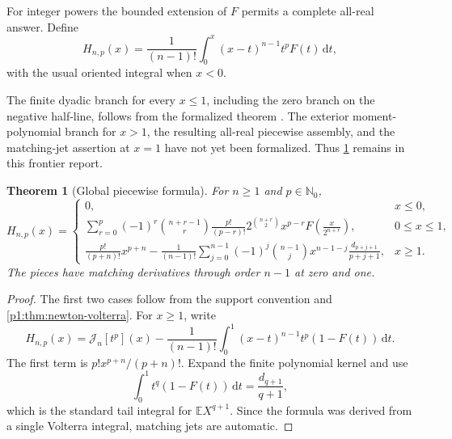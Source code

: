 \documentclass[11pt,oneside]{article}
\newtheorem{theorem}{Theorem}[section]
\theoremstyle{definition}
\theoremstyle{remark}
\newcommand{\E}{\mathbb E}
\newcommand{\N}{\mathbb N}
\newcommand{\dd}{\,\mathrm d}
\newcommand{\Jn}{\mathcal J}
\newcommand{\1}{\mathbf 1}
\begin{document}
For integer powers the bounded extension of \(F\) permits a complete all-real
answer.  Define
\begin{equation}
 H_{n,p}(x)=\frac1{(n-1)!}\int_0^x(x-t)^{n-1}t^pF(t)\dd t,       \label{p1:eq:Hnp-def}
\end{equation}
with the usual oriented integral when \(x<0\).

\begin{warningbox}
The finite dyadic branch for every \(x\leq1\), including the zero branch on
the negative half-line, follows from the formalized theorem
.  The exterior
moment-polynomial branch for \(x>1\), the resulting all-real piecewise
assembly, and the matching-jet assertion at \(x=1\) have not yet been
formalized.  Thus \cref{p1:thm:global-integer} remains in this frontier report.
\end{warningbox}

\begin{theorem}[Global piecewise formula]\label{p1:thm:global-integer}
For \(n\geq1\) and \(p\in\N_0\),
\begin{equation}
 H_{n,p}(x)=
 \begin{cases}
  0, & x\leq0,\\[1mm]
  \displaystyle
  \sum_{r=0}^{p}(-1)^r\binom{n+r-1}{r}\frac{p!}{(p-r)!}
  2^{\binom{n+r}{2}}x^{p-r}
  F\!\left(\frac{x}{2^{n+r}}\right),
   & 0\leq x\leq1,\\[4mm]
  \displaystyle
  \frac{p!}{(p+n)!}x^{p+n}
  -\frac1{(n-1)!}\sum_{j=0}^{n-1}(-1)^j\binom{n-1}{j}
  x^{n-1-j}\frac{d_{p+j+1}}{p+j+1},
   & x\geq1.
 \end{cases}                                                    \label{p1:eq:global-Hnp}
\end{equation}
The pieces have matching derivatives through order \(n-1\) at zero and one.
\end{theorem}

\begin{proof}
The first two cases follow from the support convention and
\cref{p1:thm:newton-volterra}.  For \(x\geq1\), write
\[
 H_{n,p}(x)=\Jn_n[t^p](x)
 -\frac1{(n-1)!}\int_0^1(x-t)^{n-1}t^p(1-F(t))\dd t.
\]
The first term is \(p!x^{p+n}/(p+n)!\).  Expand the finite polynomial kernel
and use
\begin{equation}
 \int_0^1t^q(1-F(t))\dd t=\frac{d_{q+1}}{q+1},                 \label{p1:eq:tail-moment}
\end{equation}
which is the standard tail integral for \(\E X^{q+1}\).  Since the formula
was derived from a single Volterra integral, matching jets are automatic.
\end{proof}
\end{document}

